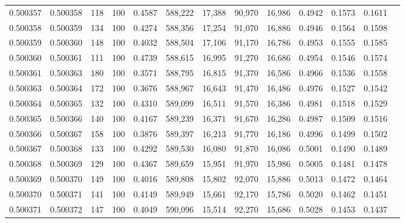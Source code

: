 \begin{tabular}{rrrrrrrrrrrrr}
0.500357 & 0.500358 &   118 & 100 &                                     0.4587 & 588,222 &  17,388 &  90,970 &  16,986 & 0.4942 & 0.1573 & 0.1611 \\
0.500358 & 0.500359 &   134 & 100 &                                     0.4274 & 588,356 &  17,254 &  91,070 &  16,886 & 0.4946 & 0.1564 & 0.1598 \\
0.500359 & 0.500360 &   148 & 100 &                                     0.4032 & 588,504 &  17,106 &  91,170 &  16,786 & 0.4953 & 0.1555 & 0.1585 \\
0.500360 & 0.500361 &   111 & 100 &                                     0.4739 & 588,615 &  16,995 &  91,270 &  16,686 & 0.4954 & 0.1546 & 0.1574 \\
0.500361 & 0.500363 &   180 & 100 &                                     0.3571 & 588,795 &  16,815 &  91,370 &  16,586 & 0.4966 & 0.1536 & 0.1558 \\
0.500363 & 0.500364 &   172 & 100 &                                     0.3676 & 588,967 &  16,643 &  91,470 &  16,486 & 0.4976 & 0.1527 & 0.1542 \\
0.500364 & 0.500365 &   132 & 100 &                                     0.4310 & 589,099 &  16,511 &  91,570 &  16,386 & 0.4981 & 0.1518 & 0.1529 \\
0.500365 & 0.500366 &   140 & 100 &                                     0.4167 & 589,239 &  16,371 &  91,670 &  16,286 & 0.4987 & 0.1509 & 0.1516 \\
0.500366 & 0.500367 &   158 & 100 &                                     0.3876 & 589,397 &  16,213 &  91,770 &  16,186 & 0.4996 & 0.1499 & 0.1502 \\
0.500367 & 0.500368 &   133 & 100 &                                     0.4292 & 589,530 &  16,080 &  91,870 &  16,086 & 0.5001 & 0.1490 & 0.1489 \\
0.500368 & 0.500369 &   129 & 100 &                                     0.4367 & 589,659 &  15,951 &  91,970 &  15,986 & 0.5005 & 0.1481 & 0.1478 \\
0.500369 & 0.500370 &   149 & 100 &                                     0.4016 & 589,808 &  15,802 &  92,070 &  15,886 & 0.5013 & 0.1472 & 0.1464 \\
0.500370 & 0.500371 &   141 & 100 &                                     0.4149 & 589,949 &  15,661 &  92,170 &  15,786 & 0.5020 & 0.1462 & 0.1451 \\
0.500371 & 0.500372 &   147 & 100 &                                     0.4049 & 590,096 &  15,514 &  92,270 &  15,686 & 0.5028 & 0.1453 & 0.1437 \\

\end{tabular}
